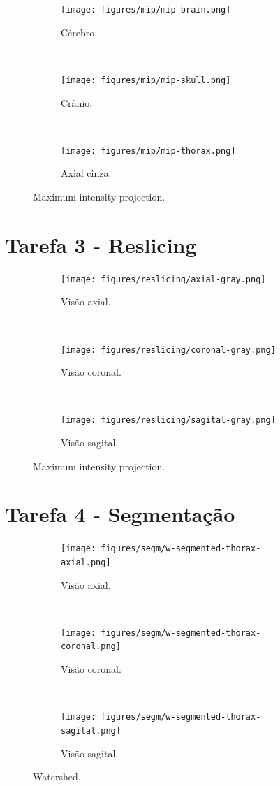 \documentclass{article}
\begin{document}
\begin{figure}[H]
    \centering
    \begin{subfigure}[b]{0.3\textwidth}
        \texttt{[image: figures/mip/mip-brain.png]}
        \caption{Cérebro.}
    \end{subfigure}
    ~
    \begin{subfigure}[b]{0.3\textwidth}
        \texttt{[image: figures/mip/mip-skull.png]}
        \caption{Crânio.}
    \end{subfigure}
    ~
    \begin{subfigure}[b]{0.3\textwidth}
        \texttt{[image: figures/mip/mip-thorax.png]}
        \caption{Axial cinza.}
    \end{subfigure}

    \caption{Maximum intensity projection.}
    \label{fig:mip}
\end{figure}

\section{Tarefa 3 - Reslicing}

\begin{figure}[H]
    \centering
    \begin{subfigure}[b]{0.3\textwidth}
        \texttt{[image: figures/reslicing/axial-gray.png]}
        \caption{Visão axial.}
    \end{subfigure}
    ~
    \begin{subfigure}[b]{0.3\textwidth}
        \texttt{[image: figures/reslicing/coronal-gray.png]}
        \caption{Visão coronal.}
    \end{subfigure}
    ~
    \begin{subfigure}[b]{0.3\textwidth}
        \texttt{[image: figures/reslicing/sagital-gray.png]}
        \caption{Visão sagital.}
    \end{subfigure}

    \caption{Maximum intensity projection.}
    \label{fig:mip}
\end{figure}

\section{Tarefa 4 - Segmentação}

\begin{figure}[H]
    \centering
    \begin{subfigure}[b]{0.3\textwidth}
        \texttt{[image: figures/segm/w-segmented-thorax-axial.png]}
        \caption{Visão axial.}
    \end{subfigure}
    ~
    \begin{subfigure}[b]{0.3\textwidth}
        \texttt{[image: figures/segm/w-segmented-thorax-coronal.png]}
        \caption{Visão coronal.}
    \end{subfigure}
    ~
    \begin{subfigure}[b]{0.3\textwidth}
        \texttt{[image: figures/segm/w-segmented-thorax-sagital.png]}
        \caption{Visão sagital.}
    \end{subfigure}

    \caption{Watershed.}
    \label{fig:watershed}
\end{figure}
\end{document}
